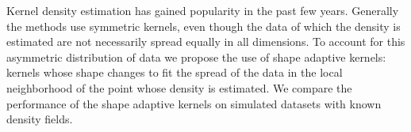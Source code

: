 \noindent Kernel density estimation has gained popularity in the past few years. 
Generally the methods use symmetric kernels, even though the data of which the density is estimated are not necessarily spread equally in all dimensions. To account for this asymmetric distribution of data we propose the use of shape adaptive kernels: kernels whose shape changes to fit the spread of the data in the local neighborhood of the point whose density is estimated.
We compare the performance of the shape adaptive kernels on simulated datasets with known density fields.
